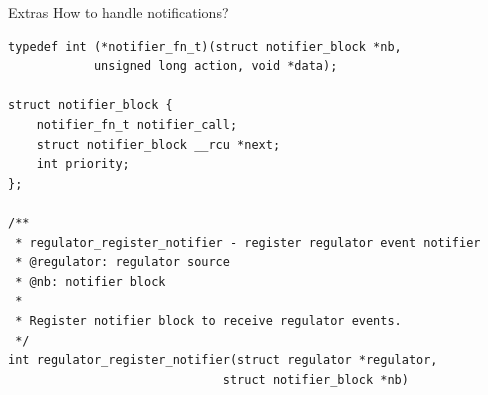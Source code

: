 \documentclass[10pt]{beamer}
\begin{document}
\addtocounter{framenumber}{-1}
\begin{frame}{Extras}
\lstset{language=C}
\scriptsize
How to handle notifications?
\begin{lstlisting}
typedef int (*notifier_fn_t)(struct notifier_block *nb,
			unsigned long action, void *data);

struct notifier_block {
	notifier_fn_t notifier_call;
	struct notifier_block __rcu *next;
	int priority;
};

/**
 * regulator_register_notifier - register regulator event notifier
 * @regulator: regulator source
 * @nb: notifier block
 *
 * Register notifier block to receive regulator events.
 */
int regulator_register_notifier(struct regulator *regulator,
                              struct notifier_block *nb) 
\end{lstlisting}
\end{frame}
\end{document}

